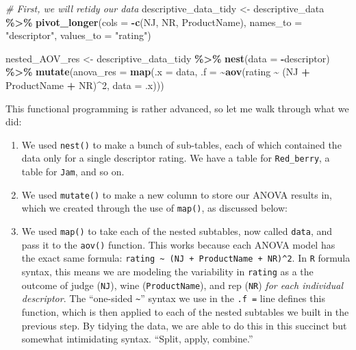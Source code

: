 \documentclass[
]{book}
\newenvironment{Shaded}{\begin{snugshade}}{\end{snugshade}}
\newcommand{\AttributeTok}[1]{\textcolor[rgb]{0.13,0.29,0.53}{#1}}
\newcommand{\CommentTok}[1]{\textcolor[rgb]{0.56,0.35,0.01}{\textit{#1}}}
\newcommand{\DecValTok}[1]{\textcolor[rgb]{0.00,0.00,0.81}{#1}}
\newcommand{\FunctionTok}[1]{\textcolor[rgb]{0.13,0.29,0.53}{\textbf{#1}}}
\newcommand{\NormalTok}[1]{#1}
\newcommand{\OtherTok}[1]{\textcolor[rgb]{0.56,0.35,0.01}{#1}}
\newcommand{\SpecialCharTok}[1]{\textcolor[rgb]{0.81,0.36,0.00}{\textbf{#1}}}
\newcommand{\StringTok}[1]{\textcolor[rgb]{0.31,0.60,0.02}{#1}}
\providecommand{\tightlist}{%
  \setlength{\itemsep}{0pt}\setlength{\parskip}{0pt}}
\begin{document}
\begin{Shaded}
\begin{Highlighting}[]
\CommentTok{\# First, we will retidy our data}
\NormalTok{descriptive\_data\_tidy }\OtherTok{\textless{}{-}} 
\NormalTok{  descriptive\_data }\SpecialCharTok{\%\textgreater{}\%}
  \FunctionTok{pivot\_longer}\NormalTok{(}\AttributeTok{cols =} \SpecialCharTok{{-}}\FunctionTok{c}\NormalTok{(NJ, NR, ProductName),}
               \AttributeTok{names\_to =} \StringTok{"descriptor"}\NormalTok{,}
               \AttributeTok{values\_to =} \StringTok{"rating"}\NormalTok{)}

\NormalTok{nested\_AOV\_res }\OtherTok{\textless{}{-}} 
\NormalTok{  descriptive\_data\_tidy }\SpecialCharTok{\%\textgreater{}\%}
  \FunctionTok{nest}\NormalTok{(}\AttributeTok{data =} \SpecialCharTok{{-}}\NormalTok{descriptor) }\SpecialCharTok{\%\textgreater{}\%}
  \FunctionTok{mutate}\NormalTok{(}\AttributeTok{anova\_res =} \FunctionTok{map}\NormalTok{(}\AttributeTok{.x =}\NormalTok{ data,}
                         \AttributeTok{.f =} \SpecialCharTok{\textasciitilde{}}\FunctionTok{aov}\NormalTok{(rating }\SpecialCharTok{\textasciitilde{}}\NormalTok{ (NJ }\SpecialCharTok{+}\NormalTok{ ProductName }\SpecialCharTok{+}\NormalTok{ NR)}\SpecialCharTok{\^{}}\DecValTok{2}\NormalTok{, }\AttributeTok{data =}\NormalTok{ .x)))}
\end{Highlighting}
\end{Shaded}

This functional programming is rather advanced, so let me walk through what we did:

\begin{enumerate}
\def\labelenumi{\arabic{enumi}.}
\tightlist
\item
  We used \texttt{nest()} to make a bunch of sub-tables, each of which contained the data only for a single descriptor rating. We have a table for \texttt{Red\_berry}, a table for \texttt{Jam}, and so on.
\item
  We used \texttt{mutate()} to make a new column to store our ANOVA results in, which we created through the use of \texttt{map()}, as discussed below:
\item
  We used \texttt{map()} to take each of the nested subtables, now called \texttt{data}, and pass it to the \texttt{aov()} function. This works because each ANOVA model has the exact same formula: \texttt{rating\ \textasciitilde{}\ (NJ\ +\ ProductName\ +\ NR)\^{}2}. In \texttt{R} formula syntax, this means we are modeling the variability in \texttt{rating} as a the outcome of judge (\texttt{NJ}), wine (\texttt{ProductName}), and rep (\texttt{NR}) \emph{for each individual descriptor}. The ``one-sided \texttt{\textasciitilde{}}'' syntax we use in the \texttt{.f\ =} line defines this function, which is then applied to each of the nested subtables we built in the previous step. By tidying the data, we are able to do this in this succinct but somewhat intimidating syntax. ``Split, apply, combine.''
\end{enumerate}
\end{document}
